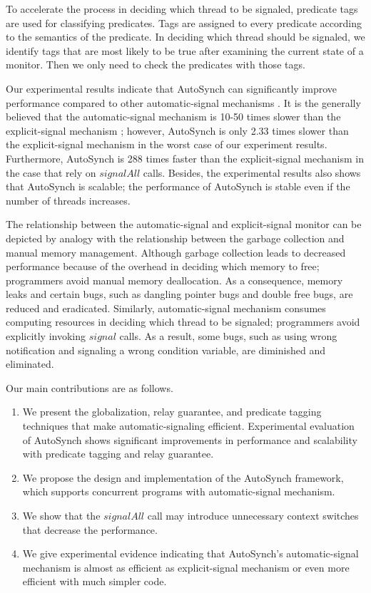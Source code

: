 \documentclass[preprint]{sigplanconf}
\begin{document}
To accelerate the process in deciding which thread to be signaled, predicate 
tags are used for classifying predicates. Tags are assigned to every predicate
according to the semantics of the predicate. In deciding which thread should be 
signaled, we identify tags that are most likely to be true after examining the 
current state of a monitor. Then we only need to check the predicates with 
those tags. 

Our experimental results indicate that AutoSynch can significantly improve
performance compared to other automatic-signal mechanisms \cite{bh05}. It is
the generally believed that the automatic-signal mechanism is 10-50 times
slower than the explicit-signal mechanism \cite{bfc95}; however, AutoSynch is 
only 2.33 times slower than the explicit-signal mechanism in the worst 
case of our experiment results. Furthermore, AutoSynch is 288 
times faster than the explicit-signal mechanism in the case that rely on 
$signalAll$ calls. Besides, the experimental results also shows that AutoSynch 
is scalable; the performance of AutoSynch is stable even if the number of 
threads increases. 


The relationship between the automatic-signal and explicit-signal monitor can be 
depicted by analogy with the relationship between the garbage collection and 
manual memory management. Although garbage collection leads to decreased
performance because of the overhead in deciding which memory to free; programmers 
avoid manual memory deallocation. As a consequence, memory leaks and certain 
bugs, such as dangling pointer bugs and double free bugs, are reduced and 
eradicated. Similarly, automatic-signal mechanism consumes computing resources 
in deciding which thread to be signaled; programmers avoid explicitly invoking 
$signal$ calls. As a result, some bugs, such as using wrong notification and
signaling a wrong condition variable, are diminished and eliminated. 

Our main contributions are as follows.
\begin{enumerate} 
    \item We present the globalization, relay guarantee, and predicate tagging
        techniques that make automatic-signaling efficient. Experimental 
        evaluation of AutoSynch shows significant improvements in performance 
        and scalability with predicate tagging and relay guarantee. 
    \item We propose the design and implementation of the AutoSynch framework,
        which supports concurrent programs with automatic-signal mechanism.
    \item We show that the $signalAll$ call may introduce unnecessary context
        switches that decrease the performance. 
    \item We give experimental evidence indicating that AutoSynch's automatic-signal
        mechanism is almost as efficient as explicit-signal mechanism or even 
        more efficient with much simpler code.
\end{enumerate} 
\end{document}
